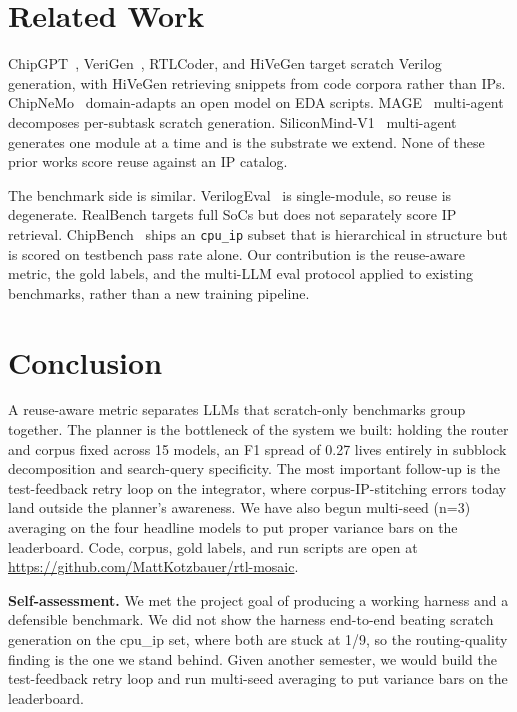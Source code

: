 \documentclass[conference]{IEEEtran}
\begin{document}
\section{Related Work}

ChipGPT~\cite{chipgpt}, VeriGen~\cite{verigen}, RTLCoder, and HiVeGen target scratch Verilog generation, with HiVeGen retrieving snippets from code corpora rather than IPs. ChipNeMo~\cite{chipnemo} domain-adapts an open model on EDA scripts. MAGE~\cite{mage} multi-agent decomposes per-subtask scratch generation. SiliconMind-V1~\cite{siliconmind} multi-agent generates one module at a time and is the substrate we extend. None of these prior works score reuse against an IP catalog.

The benchmark side is similar. VerilogEval~\cite{verilogeval} is single-module, so reuse is degenerate. RealBench targets full SoCs but does not separately score IP retrieval. ChipBench~\cite{chipbench} ships an \texttt{cpu\_ip} subset that is hierarchical in structure but is scored on testbench pass rate alone. Our contribution is the reuse-aware metric, the gold labels, and the multi-LLM eval protocol applied to existing benchmarks, rather than a new training pipeline.

\section{Conclusion}

A reuse-aware metric separates LLMs that scratch-only benchmarks group together. The planner is the bottleneck of the system we built: holding the router and corpus fixed across 15 models, an F1 spread of 0.27 lives entirely in subblock decomposition and search-query specificity. The most important follow-up is the test-feedback retry loop on the integrator, where corpus-IP-stitching errors today land outside the planner's awareness. We have also begun multi-seed (n=3) averaging on the four headline models to put proper variance bars on the leaderboard. Code, corpus, gold labels, and run scripts are open at \url{https://github.com/MattKotzbauer/rtl-mosaic}.

\textbf{Self-assessment.} We met the project goal of producing a working harness and a defensible benchmark. We did not show the harness end-to-end beating scratch generation on the cpu\_ip set, where both are stuck at 1/9, so the routing-quality finding is the one we stand behind. Given another semester, we would build the test-feedback retry loop and run multi-seed averaging to put variance bars on the leaderboard.
\end{document}
